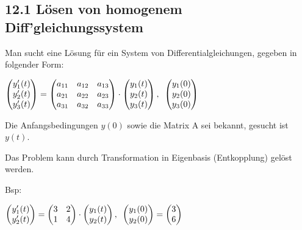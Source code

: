 \subsection{12.1 Lösen von homogenem Diff'gleichungssystem}{
\vskip1pt

Man sucht eine Lösung für ein System von Differentialgleichungen, gegeben in folgender Form: \vskip5pt

\begin{center}
$\begin{pmatrix} y_1'(t) \\ y_2'(t) \\ y_3'(t) \end{pmatrix} = \begin{pmatrix}a_{11} & a_{12} & a_{13}\\ a_{21} & a_{22}  & a_{23}\\ a_{31} & a_{32} & a_{33} \end{pmatrix} \cdot \begin{pmatrix} y_1(t) \\ y_2(t) \\ y_3(t) \end{pmatrix}, \hskip5pt \begin{pmatrix} y_1(0) \\ y_2(0) \\ y_3(0) \end{pmatrix}$
\end{center}

Die Anfangsbedingungen $y(0)$ sowie die Matrix A sei bekannt, gesucht ist $y(t)$. \par
Das Problem kann durch Transformation in Eigenbasis (Entkopplung) gelöst werden. \par
\vskip6pt

\begin{minipage}[t]{0.15 \columnwidth}
Bsp:
\end{minipage}
\begin{minipage}[t]{0.84 \columnwidth}
$\begin{pmatrix} y_1'(t) \\ y_2'(t) \end{pmatrix} = \begin{pmatrix}3 & 2 \\ 1 & 4 \end{pmatrix} \cdot \begin{pmatrix} y_1(t) \\ y_2(t)\end{pmatrix}, \hskip5pt \begin{pmatrix} y_1(0) \\ y_2(0) \end{pmatrix} = \begin{pmatrix} 3 \\ 6 \end{pmatrix}$
\end{minipage}

}
